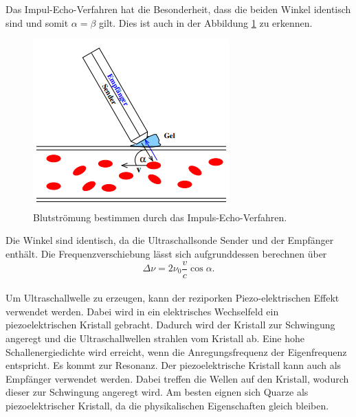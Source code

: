Das Impul-Echo-Verfahren hat die Besonderheit, dass die beiden Winkel identisch sind und somit $\alpha = \beta$ gilt.
Dies ist auch in der Abbildung \ref{fig:IEV} zu erkennen.
\begin{figure}[H]
    \centering
    \includegraphics[scale=0.5]{content/TheoBild.png}
    \caption{Blutströmung bestimmen durch das Impuls-Echo-Verfahren.}
    \label{fig:IEV}
\end{figure}
Die Winkel sind identisch, da die Ultraschallsonde Sender und der Empfänger enthält.
Die Frequenzverschiebung lässt sich aufgrunddessen berechnen über
\begin{equation}
    \Delta \nu = 2 \nu_0 \frac{v}{c} \cos \alpha.
\end{equation}
\\

\noindent Um Ultraschallwelle zu erzeugen, kann der reziporken Piezo-elektrischen Effekt verwendet werden.
Dabei wird in ein elektrisches Wechselfeld ein piezoelektrischen Kristall gebracht.
Dadurch wird der Kristall zur Schwingung angeregt und die Ultraschallwellen strahlen vom Kristall ab.
Eine hohe Schallenergiedichte wird erreicht, wenn die Anregungsfrequenz der Eigenfrequenz entspricht.
Es kommt zur Resonanz.
Der piezoelektrische Kristall kann auch als Empfänger verwendet werden.
Dabei treffen die Wellen auf den Kristall, wodurch dieser zur Schwingung angeregt wird.
Am besten eignen sich Quarze als piezoelektrischer Kristall, da die physikalischen Eigenschaften gleich bleiben.

\cite{sample}
